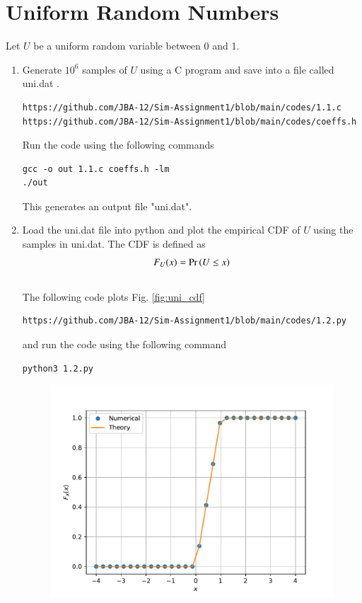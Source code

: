 \documentclass[journal,12pt,twocolumn]{IEEEtran}
\renewcommand\thesection{\arabic{section}}
\begin{document}
\section{Uniform Random Numbers}
Let $U$ be a uniform random variable between 0 and 1.
\begin{enumerate}[label=\thesection.\arabic*
,ref=\thesection.\theenumi]
\item Generate $10^6$ samples of $U$ using a C program and save into a file called uni.dat .
\\
\solution
\begin{lstlisting}
https://github.com/JBA-12/Sim-Assignment1/blob/main/codes/1.1.c
https://github.com/JBA-12/Sim-Assignment1/blob/main/codes/coeffs.h
\end{lstlisting}
Run the code using the following commands
\begin{lstlisting}
gcc -o out 1.1.c coeffs.h -lm
./out
\end{lstlisting}
This generates an output file "uni.dat".\\
%
\item
Load the uni.dat file into python and plot the empirical CDF of $U$ using the samples in uni.dat. The CDF is defined as
\begin{align}
F_{U}(x) = \Pr\left(U \le x\right)
\end{align}
\\
\solution  The following code plots Fig. \ref{fig:uni_cdf}
\begin{lstlisting}
https://github.com/JBA-12/Sim-Assignment1/blob/main/codes/1.2.py
\end{lstlisting}
and run the code using the following command
\begin{lstlisting}
python3 1.2.py
\end{lstlisting}
\begin{figure}[!htbp]
\centering
\includegraphics[width=\columnwidth]{./figs/uni_cdf}

\end{figure}
\end{enumerate}
\end{document}
